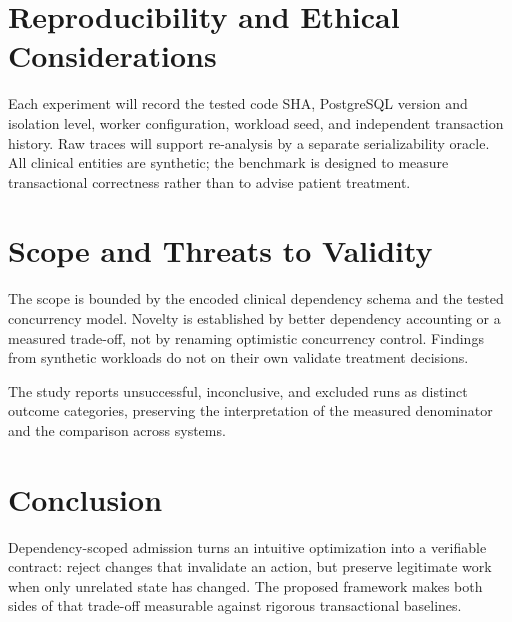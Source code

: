 \documentclass[11pt,a4paper]{article}
\begin{document}
\section{Reproducibility and Ethical Considerations}
Each experiment will record the tested code SHA, PostgreSQL version and isolation level, worker configuration, workload seed, and independent transaction history. Raw traces will support re-analysis by a separate serializability oracle. All clinical entities are synthetic; the benchmark is designed to measure transactional correctness rather than to advise patient treatment.

\section{Scope and Threats to Validity}
The scope is bounded by the encoded clinical dependency schema and the tested concurrency model. Novelty is established by better dependency accounting or a measured trade-off, not by renaming optimistic concurrency control. Findings from synthetic workloads do not on their own validate treatment decisions.

The study reports unsuccessful, inconclusive, and excluded runs as distinct outcome categories, preserving the interpretation of the measured denominator and the comparison across systems.

\section{Conclusion}
Dependency-scoped admission turns an intuitive optimization into a verifiable contract: reject changes that invalidate an action, but preserve legitimate work when only unrelated state has changed. The proposed framework makes both sides of that trade-off measurable against rigorous transactional baselines.



\end{document}
